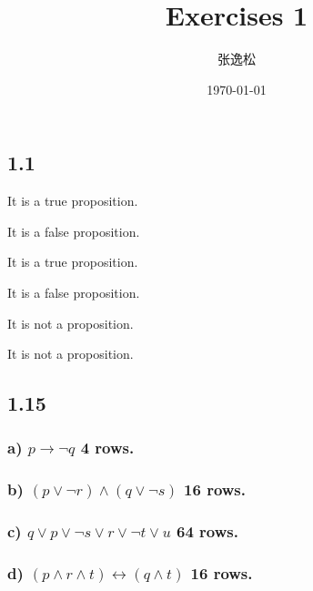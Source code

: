 \documentclass[10pt]{ctexart}
\title{Exercises 1}
\author{张逸松}
\date{\today}
\begin{document}
    \maketitle
    \subsection*{1.1}
        It is a true proposition.\par
        It is a false proposition.\par
        It is a true proposition.\par
        It is a false proposition.\par
        It is not a proposition.\par
        It is not a proposition. 

    \subsection*{1.15}
        \subsubsection*{a) $p \rightarrow \neg q$ 4 rows.}
        \subsubsection*{b) $(p \vee \neg r) \wedge (q \vee \neg s)$ 16 rows.}
        \subsubsection*{c) $q \vee p \vee \neg s \vee r \vee \neg t \vee u$ 64 rows.}
        \subsubsection*{d) $(p \wedge r \wedge t) \leftrightarrow (q \wedge t)$ 16 rows.}
\end{document}
